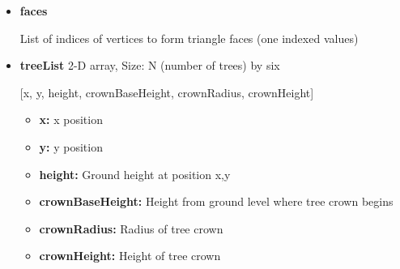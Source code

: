 \begin{itemize}
\begin{itemize}
                \item\textbf{faces} 
                \item[] List of indices of vertices to form triangle faces (one indexed values)
                \item\textbf{treeList} 2-D array, Size: N (number of trees) by six
                \item[] [x, y, height, crownBaseHeight, crownRadius, crownHeight]
                    \begin{itemize}
                    \item\textbf{x:} x position
                    \item\textbf{y:} y position
                    \item\textbf{height:} Ground height at position x,y
                    \item\textbf{crownBaseHeight:} Height from ground level where tree crown begins
                    \item\textbf{crownRadius:} Radius of tree crown
                    \item\textbf{crownHeight:} Height of tree crown 
                    \end{itemize}
                \end{itemize} 
\end{itemize}

